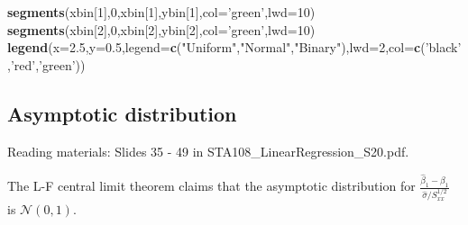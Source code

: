 \documentclass[12pt,]{book}
\newenvironment{Shaded}{\begin{snugshade}}{\end{snugshade}}
\newcommand{\KeywordTok}[1]{\textcolor[rgb]{0.13,0.29,0.53}{\textbf{#1}}}
\newcommand{\DataTypeTok}[1]{\textcolor[rgb]{0.13,0.29,0.53}{#1}}
\newcommand{\DecValTok}[1]{\textcolor[rgb]{0.00,0.00,0.81}{#1}}
\newcommand{\FloatTok}[1]{\textcolor[rgb]{0.00,0.00,0.81}{#1}}
\newcommand{\StringTok}[1]{\textcolor[rgb]{0.31,0.60,0.02}{#1}}
\newcommand{\NormalTok}[1]{#1}
\begin{document}
\begin{Shaded}
\begin{Highlighting}[]
\KeywordTok{segments}\NormalTok{(xbin[}\DecValTok{1}\NormalTok{],}\DecValTok{0}\NormalTok{,xbin[}\DecValTok{1}\NormalTok{],ybin[}\DecValTok{1}\NormalTok{],}\DataTypeTok{col=}\StringTok{'green'}\NormalTok{,}\DataTypeTok{lwd=}\DecValTok{10}\NormalTok{)}
\KeywordTok{segments}\NormalTok{(xbin[}\DecValTok{2}\NormalTok{],}\DecValTok{0}\NormalTok{,xbin[}\DecValTok{2}\NormalTok{],ybin[}\DecValTok{2}\NormalTok{],}\DataTypeTok{col=}\StringTok{'green'}\NormalTok{,}\DataTypeTok{lwd=}\DecValTok{10}\NormalTok{)}
\KeywordTok{legend}\NormalTok{(}\DataTypeTok{x=}\FloatTok{2.5}\NormalTok{,}\DataTypeTok{y=}\FloatTok{0.5}\NormalTok{,}\DataTypeTok{legend=}\KeywordTok{c}\NormalTok{(}\StringTok{"Uniform"}\NormalTok{,}\StringTok{"Normal"}\NormalTok{,}\StringTok{"Binary"}\NormalTok{),}\DataTypeTok{lwd=}\DecValTok{2}\NormalTok{,}\DataTypeTok{col=}\KeywordTok{c}\NormalTok{(}\StringTok{'black'}\NormalTok{,}\StringTok{'red'}\NormalTok{,}\StringTok{'green'}\NormalTok{))}
\end{Highlighting}
\end{Shaded}

\subsection{Asymptotic distribution}\label{asymptotic-distribution}

Reading materials: Slides 35 - 49 in STA108\_LinearRegression\_S20.pdf.

The L-F central limit theorem claims that the asymptotic distribution
for \(\frac{\hat{\beta}_1 - \beta_1}{\hat{\sigma} / S_{xx}^{1/2} }\) is
\(\mathcal{N}(0,1)\).
\end{document}
